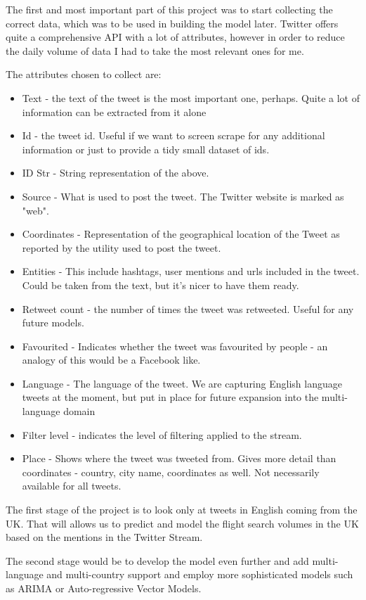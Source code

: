 \documentclass[minf,frontabs,twoside,singlespacing,parskip]{infthesis}
\begin{document}
The first and most important part of this project was to start collecting the correct data, which was to be used in building the model later. Twitter offers quite a comprehensive API with a lot of attributes, however in order to reduce the daily volume of data I had to take the most relevant ones for me. 

The attributes chosen to collect are:
\begin{itemize}
\item Text - the text of the tweet is the most important one, perhaps. Quite a lot of information can be extracted from it alone
\item Id - the tweet id. Useful if we want to screen scrape for any additional information or just to provide a tidy small dataset of ids.
\item ID Str - String representation of the above.
\item Source - What is used to post the tweet. The Twitter website is marked as "web".
\item Coordinates  - Representation of the geographical location of the Tweet as reported by the utility used to post the tweet.
\item Entities - This include hashtags, user mentions and urls included in the tweet. Could be taken from the text, but it's nicer to have them ready.
\item Retweet count - the number of times the tweet was retweeted. Useful for any future models. 
\item Favourited - Indicates whether the tweet was favourited by people - an analogy of this would be a Facebook like. 
\item Language - The language of the tweet. We are capturing English language tweets at the moment, but put in place for future expansion into the multi-language domain
\item Filter level - indicates the level of filtering applied to the stream.
\item Place - Shows where the tweet was tweeted from. Gives more detail than coordinates - country, city name, coordinates as well. Not necessarily available for all tweets.
\end{itemize}

The first stage of the project is to look only at tweets in English coming from the UK. That will allows us to predict and model the flight search volumes in the UK based on the mentions in the Twitter Stream.

The second stage would be to develop the model even further and add multi-language and multi-country support and employ more sophisticated models such as ARIMA or Auto-regressive Vector Models.
\end{document}
